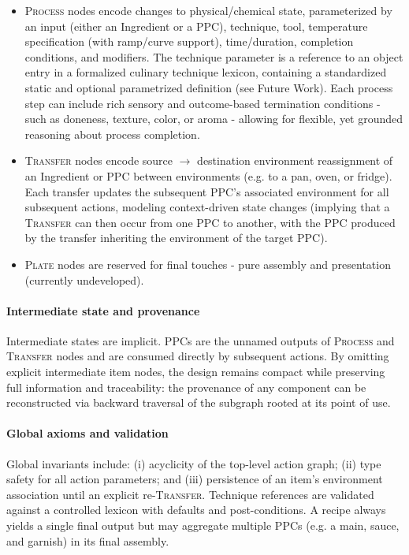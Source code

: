 \documentclass[sigconf]{acmart}
\begin{document}
\begin{itemize}
    \item \textsc{Process} nodes encode changes to physical/chemical state, parameterized by an input (either an Ingredient or a PPC), technique, tool, temperature specification (with ramp/curve support), time/duration, completion conditions, and modifiers. The technique parameter is a reference to an object entry in a formalized culinary technique lexicon, containing a standardized static and optional parametrized definition (see Future Work). Each process step can include rich sensory and outcome-based termination conditions - such as doneness, texture, color, or aroma - allowing for flexible, yet grounded reasoning about process completion.

    \item \textsc{Transfer} nodes encode source $\to$ destination environment reassignment of an Ingredient or PPC between environments (e.g. to a pan, oven, or fridge). Each transfer updates the subsequent PPC's associated environment for all subsequent actions, modeling context-driven state changes (implying that a \textsc{Transfer} can then occur from one PPC to another, with the PPC produced by the transfer inheriting the environment of the target PPC).

    \item \textsc{Plate} nodes are reserved for final touches - pure assembly and presentation (currently undeveloped).
\end{itemize}

\paragraph{Intermediate state and provenance} Intermediate states are implicit. PPCs are the unnamed outputs of \textsc{Process} and \textsc{Transfer} nodes and are consumed directly by subsequent actions. By omitting explicit intermediate item nodes, the design remains compact while preserving full information and traceability: the provenance of any component can be reconstructed via backward traversal of the subgraph rooted at its point of use.

\paragraph{Global axioms and validation} Global invariants include: (i) acyclicity of the top-level action graph; (ii) type safety for all action parameters; and (iii) persistence of an item's environment association until an explicit re-\textsc{Transfer}. Technique references are validated against a controlled lexicon with defaults and post-conditions. A recipe always yields a single final output but may aggregate multiple PPCs (e.g. a main, sauce, and garnish) in its final assembly.
\end{document}
